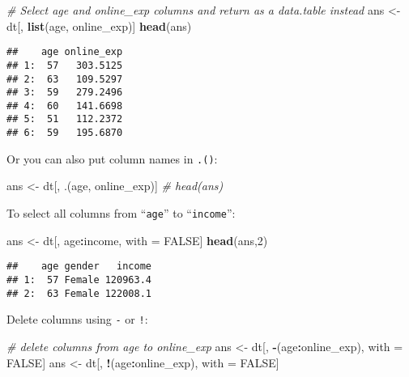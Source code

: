 \documentclass[
]{article}
\newenvironment{Shaded}{\begin{snugshade}}{\end{snugshade}}
\newcommand{\CommentTok}[1]{\textcolor[rgb]{0.56,0.35,0.01}{\textit{#1}}}
\newcommand{\DecValTok}[1]{\textcolor[rgb]{0.00,0.00,0.81}{#1}}
\newcommand{\KeywordTok}[1]{\textcolor[rgb]{0.13,0.29,0.53}{\textbf{#1}}}
\newcommand{\NormalTok}[1]{#1}
\newcommand{\OperatorTok}[1]{\textcolor[rgb]{0.81,0.36,0.00}{\textbf{#1}}}
\newcommand{\OtherTok}[1]{\textcolor[rgb]{0.56,0.35,0.01}{#1}}
\newcommand{\StringTok}[1]{\textcolor[rgb]{0.31,0.60,0.02}{#1}}
\begin{document}
\begin{Shaded}
\begin{Highlighting}[]
\CommentTok{# Select age and online_exp columns and return as a data.table instead}
\NormalTok{ans <-}\StringTok{ }\NormalTok{dt[, }\KeywordTok{list}\NormalTok{(age, online_exp)]}
\KeywordTok{head}\NormalTok{(ans)}
\end{Highlighting}
\end{Shaded}

\begin{verbatim}
##    age online_exp
## 1:  57   303.5125
## 2:  63   109.5297
## 3:  59   279.2496
## 4:  60   141.6698
## 5:  51   112.2372
## 6:  59   195.6870
\end{verbatim}

Or you can also put column names in \texttt{.()}:

\begin{Shaded}
\begin{Highlighting}[]
\NormalTok{ans <-}\StringTok{ }\NormalTok{dt[, .(age, online_exp)]}
\CommentTok{# head(ans)}
\end{Highlighting}
\end{Shaded}

To select all columns from ``\texttt{age}'' to ``\texttt{income}'':

\begin{Shaded}
\begin{Highlighting}[]
\NormalTok{ans <-}\StringTok{ }\NormalTok{dt[, age}\OperatorTok{:}\NormalTok{income, with =}\StringTok{ }\OtherTok{FALSE}\NormalTok{]}
\KeywordTok{head}\NormalTok{(ans,}\DecValTok{2}\NormalTok{)}
\end{Highlighting}
\end{Shaded}

\begin{verbatim}
##    age gender   income
## 1:  57 Female 120963.4
## 2:  63 Female 122008.1
\end{verbatim}

Delete columns using \texttt{-} or \texttt{!}:

\begin{Shaded}
\begin{Highlighting}[]
\CommentTok{# delete columns from  age to online_exp}
\NormalTok{ans <-}\StringTok{ }\NormalTok{dt[, }\OperatorTok{-}\NormalTok{(age}\OperatorTok{:}\NormalTok{online_exp), with =}\StringTok{ }\OtherTok{FALSE}\NormalTok{]}
\NormalTok{ans <-}\StringTok{ }\NormalTok{dt[, }\OperatorTok{!}\NormalTok{(age}\OperatorTok{:}\NormalTok{online_exp), with =}\StringTok{ }\OtherTok{FALSE}\NormalTok{]}
\end{Highlighting}
\end{Shaded}
\end{document}
